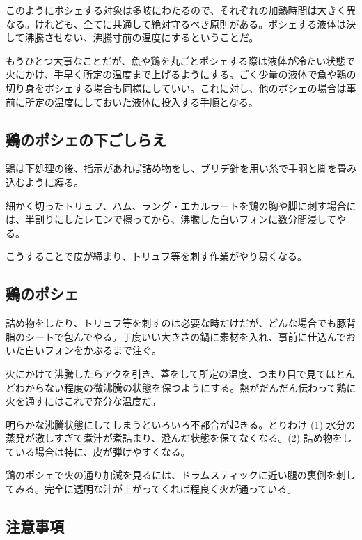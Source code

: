 このようにポシェする対象は多岐にわたるので、それぞれの加熱時間は大きく異なる。けれども、全てに共通して絶対守るべき原則がある。ポシェする液体は決して沸騰させない、沸騰寸前の温度にするということだ。

もうひとつ大事なことだが、魚や鶏を丸ごとポシェする際は液体が冷たい状態で火にかけ、手早く所定の温度まで上げるようにする。ごく少量の液体で魚や鶏の切り身をポシェする場合も同様にしていい。これに対し、他のポシェの場合は事前に所定の温度にしておいた液体に投入する手順となる。

\hypertarget{preparation-des-volailles-a-pocher}{%
\subsection{鶏のポシェの下ごしらえ}\label{preparation-des-volailles-a-pocher}}


鶏は下処理の後、指示があれば詰め物をし、ブリデ針を用い糸で手羽と脚を畳み込むように縛る。

細かく切ったトリュフ、ハム、ラング・エカルラートを鶏の胸や脚に刺す場合には、半割りにしたレモンで擦ってから、沸騰した白いフォンに数分間浸してやる。

こうすることで皮が締まり、トリュフ等を刺す作業がやり易くなる。

\hypertarget{pochage-de-la-volaille}{%
\subsection{鶏のポシェ}\label{pochage-de-la-volaille}}


詰め物をしたり、トリュフ等を刺すのは必要な時だけだが、どんな場合でも豚背脂のシートで包んでやる。丁度いい大きさの鍋に素材を入れ、事前に仕込んでおいた白いフォンをかぶるまで注ぐ。

火にかけて沸騰したらアクを引き、蓋をして所定の温度、つまり目で見てほとんどわからない程度の微沸騰の状態を保つようにする。熱がだんだん伝わって鶏に火を通すにはこれで充分な温度だ。

明らかな沸騰状態にしてしまうといろいろ不都合が起きる。とりわけ (1)
水分の蒸発が激しすぎて煮汁が煮詰まり、澄んだ状態を保てなくなる。(2)
詰め物をしている場合は特に、皮が弾けやすくなる。

鶏のポシェで火の通り加減を見るには、ドラムスティックに近い腿の裏側を刺してみる。完全に透明な汁が上がってくれば程良く火が通っている。

\hypertarget{nota-sur-les-pochages-de-volaille}{%
\subsection{注意事項}\label{nota-sur-les-pochages-de-volaille}}

